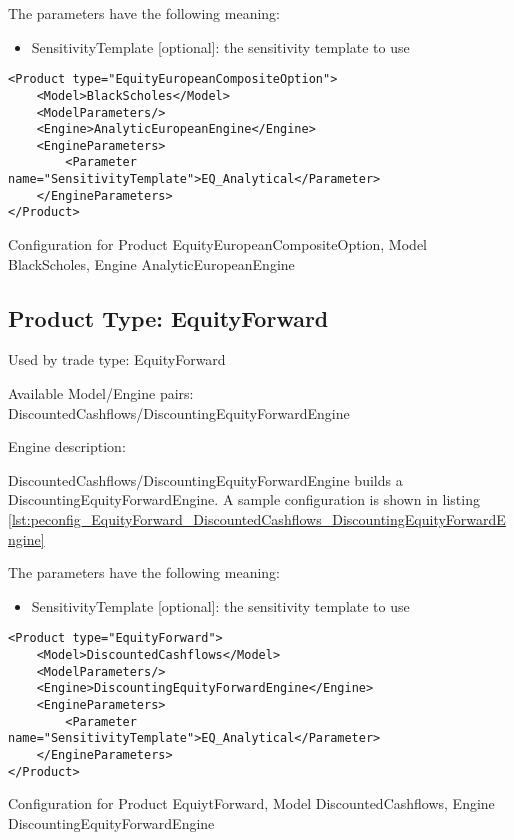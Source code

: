 The parameters have the following meaning:

\begin{itemize}
\item SensitivityTemplate [optional]: the sensitivity template to use 
\end{itemize}

\begin{longlisting}
\begin{verbatim}
<Product type="EquityEuropeanCompositeOption">
    <Model>BlackScholes</Model>
    <ModelParameters/>
    <Engine>AnalyticEuropeanEngine</Engine>
    <EngineParameters>
        <Parameter name="SensitivityTemplate">EQ_Analytical</Parameter>
    </EngineParameters>
</Product>
\end{verbatim}
\caption{Configuration for Product EquityEuropeanCompositeOption, Model BlackScholes, Engine AnalyticEuropeanEngine}
\label{lst:peconfig_EquityEuropeanCompositeOption_BlackScholes_AnalyticEuropeanEngine}
\end{longlisting}

\subsection{Product Type: EquityForward}

Used by trade type: EquityForward

Available Model/Engine pairs: DiscountedCashflows/DiscountingEquityForwardEngine

Engine description:

DiscountedCashflows/DiscountingEquityForwardEngine builds a DiscountingEquityForwardEngine. A sample configuration is
shown in listing \ref{lst:peconfig_EquityForward_DiscountedCashflows_DiscountingEquityForwardEngine}

The parameters have the following meaning:

\begin{itemize}
\item SensitivityTemplate [optional]: the sensitivity template to use 
\end{itemize}

\begin{longlisting}
\begin{verbatim}
<Product type="EquityForward">
    <Model>DiscountedCashflows</Model>
    <ModelParameters/>
    <Engine>DiscountingEquityForwardEngine</Engine>
    <EngineParameters>
        <Parameter name="SensitivityTemplate">EQ_Analytical</Parameter>
    </EngineParameters>
</Product>
\end{verbatim}
\caption{Configuration for Product EquiytForward, Model DiscountedCashflows, Engine DiscountingEquityForwardEngine}
\label{lst:peconfig_EquityForward_DiscountedCashflows_DiscountingEquityForwardEngine}
\end{longlisting}

